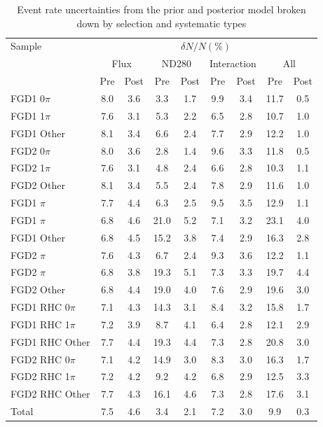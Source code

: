 \begin{table}
	\begin{tabular}{l | c c | c c | c c | c c}
		\hline
		\hline 
		Sample & \multicolumn{8}{c}{$\delta N/N (\%)$} \\
		& \multicolumn{2}{c|}{Flux} & \multicolumn{2}{c|}{ND280} & \multicolumn{2}{c|}{Interaction} & \multicolumn{2}{c}{All} \\
		& Pre & Post & Pre & Post & Pre & Post & Pre & Post \\
		\hline
		FGD1 0$\pi$ & 8.0 & 3.6 & 3.3 & 1.7 & 9.9 & 3.4 & 11.7 & 0.5\\
		FGD1 1$\pi$ & 7.6 & 3.1 & 5.3 & 2.2 & 6.5 & 2.8 & 10.7 & 1.0 \\
		FGD1 Other & 8.1 & 3.4 & 6.6 & 2.4 & 7.7 & 2.9 & 12.2 & 1.0 \\
		FGD2 0$\pi$ & 8.0 & 3.6 & 2.8 & 1.4 & 9.6 & 3.3 & 11.8 & 0.5 \\
		FGD2 1$\pi$ & 7.6 & 3.1 & 4.8 & 2.4 & 6.6 & 2.8 & 10.3 & 1.1 \\
		FGD2 Other & 8.1 & 3.4 & 5.5 & 2.4 & 7.8 & 2.9 & 11.6 & 1.0 \\
		\hline
		FGD1 \numubar 0$\pi$ & 7.7 & 4.4 & 6.3 & 2.5 & 9.5 & 3.5 & 12.9 & 1.1 \\
		FGD1 \numubar 1$\pi$ & 6.8 & 4.6 & 21.0 & 5.2 & 7.1 & 3.2 & 23.1 & 4.0 \\
		FGD1 \numubar Other & 6.8 & 4.5 & 15.2 & 3.8 & 7.4 & 2.9 & 16.3 & 2.8 \\
		FGD2 \numubar 0$\pi$ & 7.6 & 4.3 &  6.7 & 2.4 & 9.3 & 3.6 & 12.2 & 1.1 \\
		FGD2 \numubar 1$\pi$ & 6.8 & 3.8 & 19.3 & 5.1 & 7.3 & 3.3 & 19.7 & 4.4 \\
		FGD2 \numubar Other & 6.8 & 4.4 & 19.0 & 4.0 & 7.6 & 2.9 & 19.6 & 3.0 \\
		\hline
		FGD1 \numu RHC 0$\pi$ & 7.1 & 4.3 & 14.3 & 3.1 & 8.4 & 3.2 & 15.8 & 1.7 \\
		FGD1 \numu RHC 1$\pi$ & 7.2 & 3.9 & 8.7 & 4.1 & 6.4 & 2.8 & 12.1 & 2.9 \\
		FGD1 \numu RHC Other & 7.7 & 4.4 & 19.3 & 4.4 & 7.3 & 2.8 & 20.8 & 3.0 \\
		FGD2 \numu RHC 0$\pi$ & 7.1 & 4.2 & 14.9 & 3.0 & 8.3 & 3.0 & 16.3 & 1.7 \\
		FGD2 \numu RHC 1$\pi$ & 7.2 & 4.2 & 9.2 & 4.2 & 6.8 & 2.9 & 12.5 & 3.3 \\
		FGD2 \numu RHC Other & 7.7 & 4.3 & 16.1 & 4.6 & 7.3 & 2.8 & 17.6 & 3.1 \\
		\hline
		Total & 7.5 & 4.6 & 3.4 & 2.1 & 7.2 & 3.0 & 9.9 & 0.3 \\
		\hline
		\hline
	\end{tabular}
	\caption{Event rate uncertainties from the prior and posterior model broken down by selection and systematic types}
	\label{tab:2018_syst_uncertain}
\end{table}

